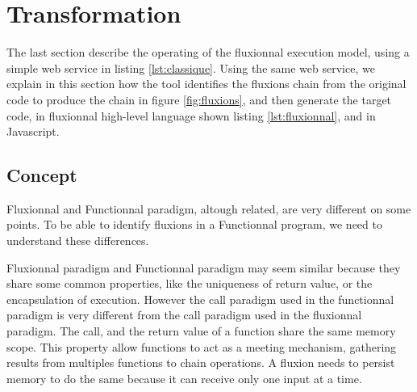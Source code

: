 \section{Transformation}







The last section describe the operating of the fluxionnal execution model, using a simple web service in listing \ref{lst:classique}.
Using the same web service, we explain in this section how the tool identifies the fluxions chain from the original code to produce the chain in figure \ref{fig:fluxions}, and then generate the target code, in fluxionnal high-level language shown listing \ref{lst:fluxionnal}, and in Javascript.


\subsection{Concept}

Fluxionnal and Functionnal paradigm, altough related, are very different on some points. To be able to identify fluxions in a Functionnal program, we need to understand these differences.





Fluxionnal paradigm and Functionnal paradigm may seem similar because they share some common properties, like the uniqueness of return value, or the encapsulation of execution.
However the call paradigm used in the functionnal paradigm is very different from the call paradigm used in the fluxionnal paradigm.
The call, and the return value of a function share the same memory scope.
This property allow functions to act as a meeting mechanism, gathering results from multiples functions to chain operations.
A fluxion needs to persist memory to do the same because it can receive only one input at a time.

